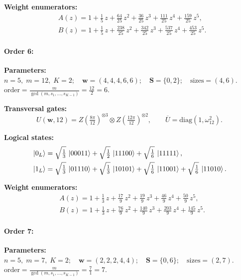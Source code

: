 \documentclass[pdflatex,sn-nature]{sn-jnl}%
\theoremstyle{thmstyleone}%
\theoremstyle{thmstyletwo}%
\theoremstyle{thmstylethree}%
\begin{document}
\begin{appendices}
\noindent\textbf{Weight enumerators:}
\begin{align*}
    &A(z) = 1 + \tfrac{1}{5}\,z + \tfrac{64}{25}\,z^{2} + \tfrac{36}{25}\,z^{3} + \tfrac{111}{25}\,z^{4} + \tfrac{159}{25}\,z^{5}, \\
    &B(z) = 1 + \tfrac{1}{5}\,z + \tfrac{238}{25}\,z^{2} + \tfrac{342}{25}\,z^{3} + \tfrac{537}{25}\,z^{4} + \tfrac{453}{25}\,z^{5}.
\end{align*}

\paragraph{\textbf{Order 6:}}
\noindent\textbf{Parameters:} $n=5,\; m=12,\; K=2;\quad \mathbf w=(4, 4, 4, 6, 6);\quad \mathbf S=\{0, 2\};\quad \text{sizes}=\left(4, 6\right).$ $\displaystyle \text{order}=\frac{m}{\gcd(m,s_1,\dots,s_{K-1})}=\frac{12}{2}=6.$

\noindent\textbf{Transversal gates:}
\[
    U(\mathbf w,12)=Z \left(\tfrac{8\pi}{12}\right)^{\otimes3} \otimes Z \left(\tfrac{12\pi}{12}\right)^{\otimes2},\qquad
    \overline U=\mathrm{diag}(1,\omega_{12}^{2}).
\]

\noindent\textbf{Logical states:}
\begin{align*}
    &\ket{0_L} = \sqrt{\tfrac{1}{3}}\,\ket{00011} + \sqrt{\tfrac{1}{2}}\,\ket{11100} + \sqrt{\tfrac{1}{6}}\,\ket{11111}, \\
    &\ket{1_L} = \sqrt{\tfrac{1}{3}}\,\ket{01110} + \sqrt{\tfrac{1}{3}}\,\ket{10101} + \sqrt{\tfrac{1}{6}}\,\ket{11001} + \sqrt{\tfrac{1}{6}}\,\ket{11010}.
\end{align*}

\noindent\textbf{Weight enumerators:}
\begin{align*}
    &A(z) = 1 + \tfrac{1}{3}\,z + \tfrac{17}{9}\,z^{2} + \tfrac{19}{9}\,z^{3} + \tfrac{46}{9}\,z^{4} + \tfrac{50}{9}\,z^{5}, \\
    &B(z) = 1 + \tfrac{1}{3}\,z + \tfrac{76}{9}\,z^{2} + \tfrac{140}{9}\,z^{3} + \tfrac{203}{9}\,z^{4} + \tfrac{145}{9}\,z^{5}.
\end{align*}


\paragraph{\textbf{Order 7:}}
\noindent\textbf{Parameters:} $n=5,\; m=7,\; K=2;\quad \mathbf w=(2, 2, 2, 4, 4);\quad \mathbf S=\{0, 6\};\quad \text{sizes}=\left(2, 7\right).$ $\displaystyle \text{order}=\frac{m}{\gcd(m,s_1,\dots,s_{K-1})}=\frac{7}{1}=7.$


\end{appendices}
\end{document}
